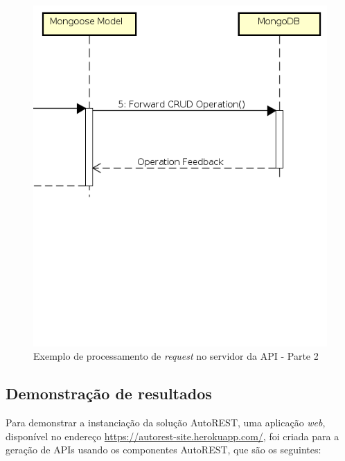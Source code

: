 \begin{figure}
    \begin{center}
        \includegraphics[scale=0.7]{imagens/API_Sequence_Diagram_2.png}
    \end{center}
	\caption{\label{fig:seq_api_2}Exemplo de processamento de \textit{request} no servidor da API - Parte 2}
\end{figure}

\subsection{Demonstração de resultados}
\label{sec:demo}

Para demonstrar a instanciação da solução AutoREST, uma aplicação \textit{web}, disponível no endereço \url{https://autorest-site.herokuapp.com/}, foi criada para a geração de APIs usando os componentes AutoREST, que são os seguintes:

